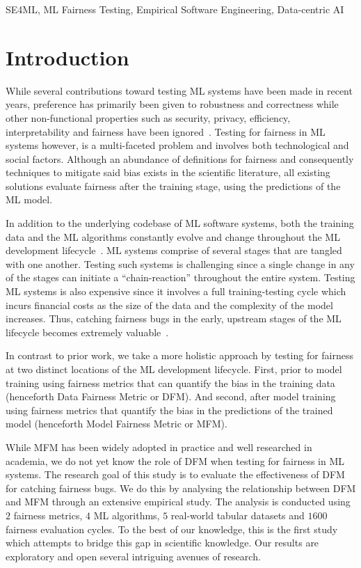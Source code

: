 \documentclass[conference]{IEEEtran}
\begin{document}
\begin{IEEEkeywords}
SE4ML, ML Fairness Testing, Empirical Software Engineering, Data-centric AI
\end{IEEEkeywords}

\section{Introduction}\label{sec:intro}

While several contributions toward testing ML systems have been made
in recent years, preference has primarily been given to robustness and
correctness while other non-functional properties such as security,
privacy, efficiency, interpretability and fairness have been
ignored \cite{zhang2020machine,zhang2021ignorance,mehrabi2021survey,wan2021modeling}. Testing
for fairness in ML systems however, is a multi-faceted problem and
involves both technological and social factors. Although an abundance
of definitions for fairness and consequently techniques to mitigate
said bias exists in the scientific literature, all existing solutions
evaluate fairness after the training stage, using the predictions of
the ML model.

In addition to the underlying codebase of ML software systems, both
the training data and the ML algorithms constantly evolve and change
throughout the ML development
lifecycle \cite{sculley2015hidden,bosch2021engineering,hutchinson2021towards}.
ML systems comprise of several stages that are tangled with one
another. Testing such systems is challenging since a single change in
any of the stages can initiate a ``chain-reaction'' throughout the
entire system. Testing ML systems is also expensive since it involves
a full training-testing cycle which incurs financial costs as the size
of the data and the complexity of the model increases. Thus, catching
fairness bugs in the early, upstream stages of the ML lifecycle
becomes extremely valuable \cite{shome2022data}.

In contrast to prior work, we take a more holistic approach by testing
for fairness at two distinct locations of the ML development
lifecycle. First, prior to model training using fairness metrics that
can quantify the bias in the training data (henceforth Data Fairness
Metric or DFM). And second, after model training using fairness
metrics that quantify the bias in the predictions of the trained model
(henceforth Model Fairness Metric or MFM).

While MFM has been widely adopted in practice and well researched in
academia, we do not yet know the role of DFM when testing for fairness
in ML systems. The research goal of this study is to evaluate the
effectiveness of DFM for catching fairness bugs. We do this by
analysing the relationship between DFM and MFM through an extensive
empirical study. The analysis is conducted using $2$ fairness metrics,
$4$ ML algorithms, $5$ real-world tabular datasets and $1600$ fairness
evaluation cycles. To the best of our knowledge, this is the first
study which attempts to bridge this gap in scientific knowledge. Our
results are exploratory and open several intriguing avenues of
research.
\end{document}
